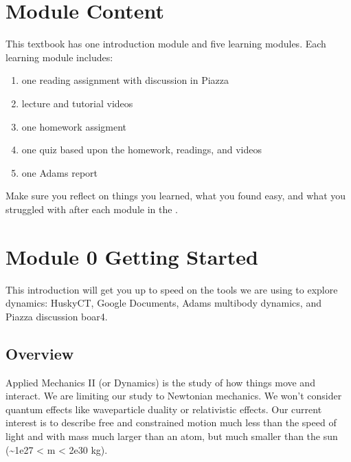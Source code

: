 \documentclass[letterpaper,10pt,english]{sphinxmanual}
\begin{document}
\chapter{Module Content}
\label{\detokenize{content:module-content}}\label{\detokenize{content::doc}}
This textbook has one introduction module and five learning modules.
Each learning module includes:
\begin{enumerate}
%
\item {} 
one reading assignment with discussion in Piazza

\item {} 
lecture and tutorial videos

\item {} 
one homework assigment

\item {} 
one quiz based upon the homework, readings, and videos

\item {} 
one Adams report

\end{enumerate}

Make sure you reflect on things you learned, what you found easy, and
what you struggled with after each module in the .


\chapter{Module 0 \sphinxhyphen{} Getting Started}
\label{\detokenize{module_00/overview:module-0-getting-started}}\label{\detokenize{module_00/overview::doc}}
This introduction will get you up to speed on the tools we are using to
explore dynamics: HuskyCT, Google Documents, Adams multibody dynamics,
and Piazza discussion boar4.


\section{Overview}
\label{\detokenize{module_00/introduction:overview}}\label{\detokenize{module_00/introduction::doc}}


Applied Mechanics II (or Dynamics) is the study of how things move and interact.
We are limiting our study to Newtonian mechanics. We won’t consider quantum
effects like wave\sphinxhyphen{}particle duality or relativistic effects. Our current interest
is to describe free and constrained motion much less than the speed of light and
with mass much larger than an atom, but much smaller than the sun (\textasciitilde{}1e\sphinxhyphen{}27 \textless{} m \textless{}
2e30 kg).
\end{document}
